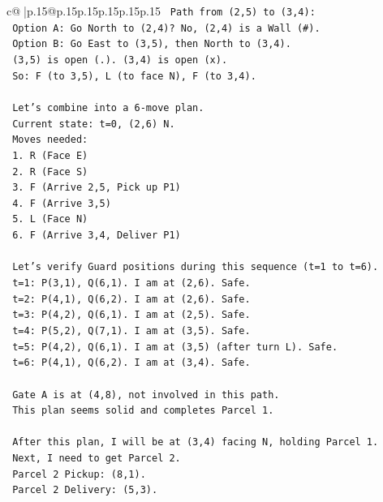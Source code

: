 \documentclass{article}
\begin{document}
{\begin{supertabular}{c@{$\;$}|p{.15\linewidth}@{}p{.15\linewidth}p{.15\linewidth}p{.15\linewidth}p{.15\linewidth}p{.15\linewidth}}
{{{\texttt{   Path from (2,5) to (3,4):} \\
\texttt{   Option A: Go North to (2,4)? No, (2,4) is a Wall (\#).} \\
\texttt{   Option B: Go East to (3,5), then North to (3,4).} \\
\texttt{   (3,5) is open (.). (3,4) is open (x).} \\
\texttt{   So: F (to 3,5), L (to face N), F (to 3,4).} \\
\\ 
\texttt{   Let's combine into a 6{-}move plan.} \\
\texttt{   Current state: t=0, (2,6) N.} \\
\texttt{   Moves needed:} \\
\texttt{   1. R (Face E)} \\
\texttt{   2. R (Face S)} \\
\texttt{   3. F (Arrive 2,5, Pick up P1)} \\
\texttt{   4. F (Arrive 3,5)} \\
\texttt{   5. L (Face N)} \\
\texttt{   6. F (Arrive 3,4, Deliver P1)} \\
\\ 
\texttt{   Let's verify Guard positions during this sequence (t=1 to t=6).} \\
\texttt{   t=1: P(3,1), Q(6,1). I am at (2,6). Safe.} \\
\texttt{   t=2: P(4,1), Q(6,2). I am at (2,6). Safe.} \\
\texttt{   t=3: P(4,2), Q(6,1). I am at (2,5). Safe.} \\
\texttt{   t=4: P(5,2), Q(7,1). I am at (3,5). Safe.} \\
\texttt{   t=5: P(4,2), Q(6,1). I am at (3,5) (after turn L). Safe.} \\
\texttt{   t=6: P(4,1), Q(6,2). I am at (3,4). Safe.} \\
\\ 
\texttt{   Gate A is at (4,8), not involved in this path.} \\
\texttt{   This plan seems solid and completes Parcel 1.} \\
\\ 
\texttt{   After this plan, I will be at (3,4) facing N, holding Parcel 1.} \\
\texttt{   Next, I need to get Parcel 2.} \\
\texttt{   Parcel 2 Pickup: (8,1).} \\
\texttt{   Parcel 2 Delivery: (5,3).} \\
}}}
\end{supertabular}}
\end{document}
